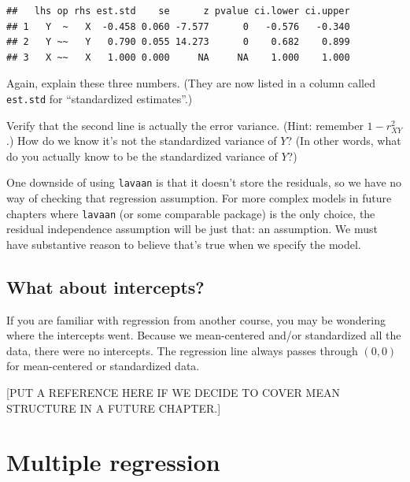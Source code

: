 \documentclass[
]{book}
\begin{document}
\begin{verbatim}
##   lhs op rhs est.std    se      z pvalue ci.lower ci.upper
## 1   Y  ~   X  -0.458 0.060 -7.577      0   -0.576   -0.340
## 2   Y ~~   Y   0.790 0.055 14.273      0    0.682    0.899
## 3   X ~~   X   1.000 0.000     NA     NA    1.000    1.000
\end{verbatim}

Again, explain these three numbers. (They are now listed in a column called \texttt{est.std} for ``standardized estimates''.)

Verify that the second line is actually the error variance. (Hint: remember \(1 - r_{XY}^{2}\).) How do we know it's not the standardized variance of \(Y\)? (In other words, what do you actually know to be the standardized variance of \(Y\)?)

One downside of using \texttt{lavaan} is that it doesn't store the residuals, so we have no way of checking that regression assumption. For more complex models in future chapters where \texttt{lavaan} (or some comparable package) is the only choice, the residual independence assumption will be just that: an assumption. We must have substantive reason to believe that's true when we specify the model.

\hypertarget{simple-intercepts}{%
\section{What about intercepts?}\label{simple-intercepts}}

If you are familiar with regression from another course, you may be wondering where the intercepts went. Because we mean-centered and/or standardized all the data, there were no intercepts. The regression line always passes through \((0, 0)\) for mean-centered or standardized data.

{[}PUT A REFERENCE HERE IF WE DECIDE TO COVER MEAN STRUCTURE IN A FUTURE CHAPTER.{]}

\hypertarget{multiple}{%
\chapter{Multiple regression}\label{multiple}}
\end{document}
